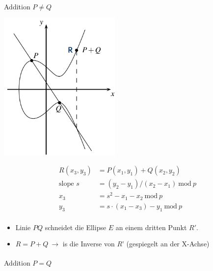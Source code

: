 \documentclass[
  10pt,
  a4paper,
]{article}
\makeatletter
\let\oldparagraph\paragraph
\renewcommand{\paragraph}{
    \@ifstar
      \xxxParagraphStar
      \xxxParagraphNoStar
  }
\newcommand{\xxxParagraphStar}[1]{\oldparagraph*{#1}\mbox{}}
\newcommand{\xxxParagraphNoStar}[1]{\oldparagraph{#1}\mbox{}}
\providecommand{\tightlist}{%
  \setlength{\itemsep}{0pt}\setlength{\parskip}{0pt}}\usepackage{longtable,booktabs,array}
\makeatother
\begin{document}
\begin{multicols*}{2}
\paragraph{\texorpdfstring{Addition
\(P \neq Q\)}{Addition P \textbackslash neq Q}}\label{addition-p-neq-q}

\begin{center}
\includegraphics[width=6cm,height=\textheight]{images/crypto/image-25.png}
\end{center}

\[
\begin{split}
R(x_3,y_3) &= P(x_1,y_1) + Q(x_2,y_2) \\
\text{slope } s &= (y_2-y_1)/(x_2-x_1) ~\text{mod}~ p \\
x_3 &= s^2-x_1-x_2 ~\text{mod}~ p \\
y_3 &= s\cdot(x_1-x_3)-y_1 ~\text{mod}~ p \\
\end{split}
\]

\begin{itemize}
\tightlist
\item
  Linie \(PQ\) schneidet die Ellipse \(E\) an einem dritten Punkt
  \(R'\).
\item
  \(R=P+Q ~\rightarrow\) is die Inverse von \(R’\) (gespiegelt an der
  X-Achse)
\end{itemize}

\paragraph{\texorpdfstring{Addition
\(P = Q\)}{Addition P = Q}}\label{addition-p-q}


\end{multicols*}
\end{document}
